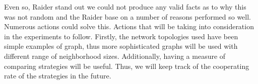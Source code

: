 Even so, Raider stand out we could not produce any valid facts as to why this
was not random and the Raider base on a number of reasons performed so well.
Numerous actions could solve this. Actions that will be taking into consideration
in the experiments to follow. Firstly, the network topologies used have been
simple examples of graph, thus more sophisticated graphs will be used
with different range of neighborhood sizes. Additionally, having a measure of
comparing strategies will be useful. Thus, we will keep track of the cooperating
rate of the strategies in the future.
